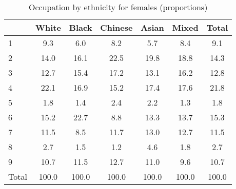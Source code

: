 \begin{table}[htbp]\centering
\def\sym#1{\ifmmode^{#1}\else\(^{#1}\)\fi}
\caption{Occupation by ethnicity for females (proportions)}
\begin{tabular}{l*{6}{c}}
\hline\hline
          &    White&    Black&  Chinese&    Asian&    Mixed&    Total\\
\hline
1         &      9.3&      6.0&      8.2&      5.7&      8.4&      9.1\\
2         &     14.0&     16.1&     22.5&     19.8&     18.8&     14.3\\
3         &     12.7&     15.4&     17.2&     13.1&     16.2&     12.8\\
4         &     22.1&     16.9&     15.2&     17.4&     17.6&     21.8\\
5         &      1.8&      1.4&      2.4&      2.2&      1.3&      1.8\\
6         &     15.2&     22.7&      8.8&     13.3&     13.7&     15.3\\
7         &     11.5&      8.5&     11.7&     13.0&     12.7&     11.5\\
8         &      2.7&      1.5&      1.2&      4.6&      1.8&      2.7\\
9         &     10.7&     11.5&     12.7&     11.0&      9.6&     10.7\\
Total     &    100.0&    100.0&    100.0&    100.0&    100.0&    100.0\\
\hline\hline
\end{tabular}
\label{tab:occup_female}
\end{table}
